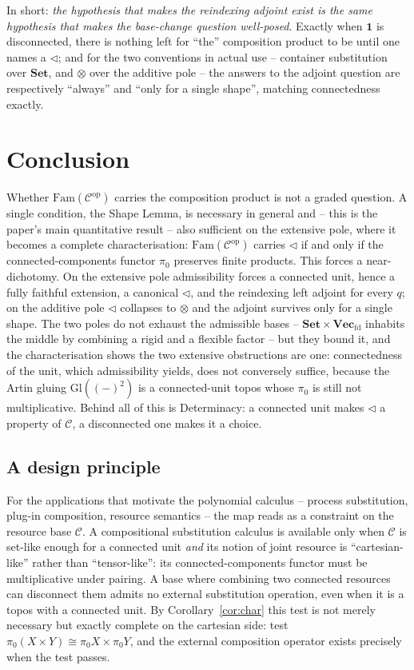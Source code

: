 \documentclass[11pt]{amsart}
\theoremstyle{plain}
\theoremstyle{definition}
\newcommand{\C}{\mathcal{C}}
\newcommand{\Fam}{\mathrm{Fam}}
\newcommand{\Setb}{\mathbf{Set}}
\newcommand{\Vecfd}{\mathbf{Vec}_{\mathrm{fd}}}
\newcommand{\Gl}{\mathrm{Gl}}
\newcommand{\op}{\mathrm{op}}
\newcommand{\comp}{\mathbin{\triangleleft}}
\newcommand{\one}{\mathbf{1}}
\newcommand{\pizero}{\pi_0}
\begin{document}
In short: \emph{the hypothesis that makes the reindexing adjoint exist is the same hypothesis that
makes the base-change question well-posed}. Exactly when $\one$ is disconnected, there is nothing left
for ``the'' composition product to be until one names a $\comp$; and for the two conventions in actual
use -- container substitution over $\Setb$, and $\otimes$ over the additive pole -- the answers to the
adjoint question are respectively ``always'' and ``only for a single shape'', matching connectedness
exactly.

\section{Conclusion}\label{sec:conclusion}

Whether $\Fam(\C^{\op})$ carries the composition product is not a graded question. A single condition,
the Shape Lemma, is necessary in general and -- this is the paper's main quantitative result -- also
sufficient on the extensive pole, where it becomes a complete characterisation: $\Fam(\C^{\op})$
carries $\comp$ if and only if the connected-components functor $\pizero$ preserves finite products.
This forces a near-dichotomy. On the extensive pole admissibility forces a
connected unit, hence a fully faithful extension, a canonical $\comp$, and the reindexing left adjoint
for every $q$; on the additive pole $\comp$ collapses to $\otimes$ and the adjoint survives only for a
single shape. The two poles do not exhaust the admissible bases -- $\Setb\times\Vecfd$ inhabits the
middle by combining a rigid and a flexible factor -- but they bound it, and the characterisation shows
the two extensive obstructions are one: connectedness of the unit, which admissibility yields, does
not conversely suffice, because the Artin gluing $\Gl((-)^2)$ is a connected-unit topos whose
$\pizero$ is still not multiplicative. Behind all of this is Determinacy: a connected unit makes
$\comp$ a property of $\C$, a disconnected one makes it a choice.

\subsection*{A design principle}
For the applications that motivate the polynomial calculus -- process substitution, plug-in
composition, resource semantics -- the map reads as a constraint on the resource base $\C$. A
compositional substitution calculus is available only when $\C$ is set-like enough for a connected
unit \emph{and} its notion of joint resource is ``cartesian-like'' rather than ``tensor-like'': its
connected-components functor must be multiplicative under pairing. A base where combining two
connected resources can disconnect them admits no external substitution operation, even when it is a
topos with a connected unit. By Corollary~\ref{cor:char} this test is not merely necessary but
exactly complete on the cartesian side: test $\pizero(X\times Y)\cong\pizero X\times\pizero Y$, and
the external composition operator exists precisely when the test passes.
\end{document}
